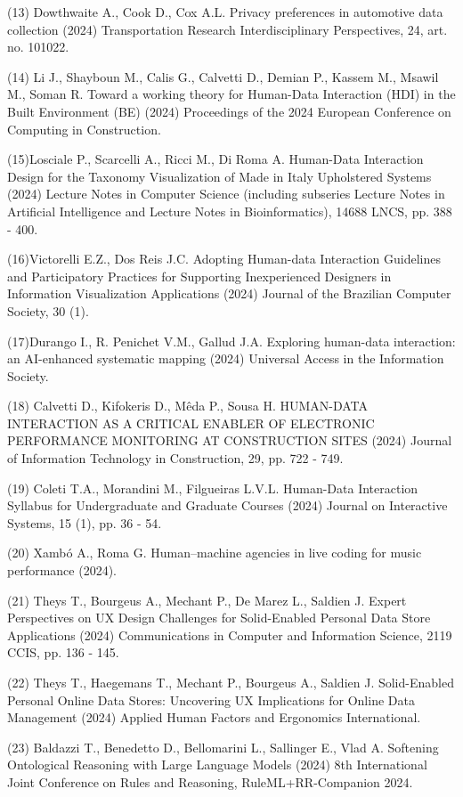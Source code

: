 \documentclass[
	12pt,				%
	oneside,			%
	a4paper,			%
	english,			%
	brazil				%
	]{abntex2ppgsi}
\begin{document}
\begin{apendicesenv}
(13) Dowthwaite A., Cook D., Cox A.L. Privacy preferences in automotive data collection (2024) Transportation Research Interdisciplinary Perspectives, 24, art. no. 101022.

(14) Li J., Shayboun M., Calis G., Calvetti D., Demian P., Kassem M., Msawil M., Soman R. Toward a working theory for Human-Data Interaction (HDI) in the Built Environment (BE) (2024) Proceedings of the 2024 European Conference on Computing in Construction.

(15)Losciale P., Scarcelli A., Ricci M., Di Roma A. Human-Data Interaction Design for the Taxonomy Visualization of Made in Italy Upholstered Systems (2024) Lecture Notes in Computer Science (including subseries Lecture Notes in Artificial Intelligence and Lecture Notes in Bioinformatics), 14688 LNCS, pp. 388 - 400.

(16)Victorelli E.Z., Dos Reis J.C. Adopting Human-data Interaction Guidelines and Participatory Practices for Supporting Inexperienced Designers in Information Visualization Applications (2024) Journal of the Brazilian Computer Society, 30 (1).

(17)Durango I., R. Penichet V.M., Gallud J.A. Exploring human-data interaction: an AI-enhanced systematic mapping
(2024) Universal Access in the Information Society.

(18) Calvetti D., Kifokeris D., Mêda P., Sousa H. HUMAN-DATA INTERACTION AS A CRITICAL ENABLER OF ELECTRONIC PERFORMANCE MONITORING AT CONSTRUCTION SITES (2024) Journal of Information Technology in Construction, 29, pp. 722 - 749.

(19) Coleti T.A., Morandini M., Filgueiras L.V.L. Human-Data Interaction Syllabus for Undergraduate and Graduate Courses (2024) Journal on Interactive Systems, 15 (1), pp. 36 - 54.

(20) Xambó A., Roma G. Human–machine agencies in live coding for music performance (2024).

(21) Theys T., Bourgeus A., Mechant P., De Marez L., Saldien J. Expert Perspectives on UX Design Challenges for Solid-Enabled Personal Data Store Applications (2024) Communications in Computer and Information Science, 2119 CCIS, pp. 136 - 145.

(22) Theys T., Haegemans T., Mechant P., Bourgeus A., Saldien J. Solid-Enabled Personal Online Data Stores: Uncovering UX Implications for Online Data Management (2024) Applied Human Factors and Ergonomics International.

(23) Baldazzi T., Benedetto D., Bellomarini L., Sallinger E., Vlad A. Softening Ontological Reasoning with Large Language Models (2024) 8th International Joint Conference on Rules and Reasoning, RuleML+RR-Companion 2024.



\end{apendicesenv}
\end{document}
